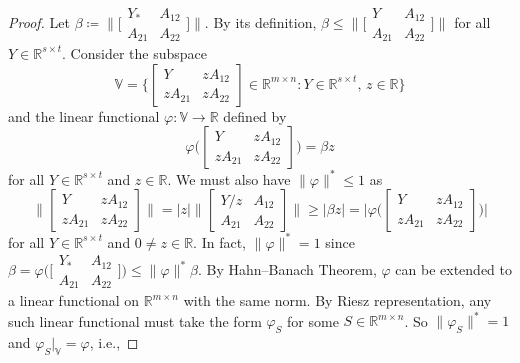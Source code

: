 \documentclass[10pt,a4paper]{amsart}
\newcommand{\R}{\mathbb{R}}
\begin{document}
\begin{proof}
Let $\beta \coloneqq \bigl \lVert \bigl[\begin{smallmatrix}
    Y_* & A_{12} \\
A_{21} & A_{22}
\end{smallmatrix}\bigr]  \bigr\rVert$. By its definition, $\beta \le \bigl \lVert \bigl[\begin{smallmatrix}
    Y & A_{12} \\
A_{21} & A_{22}
\end{smallmatrix}\bigr]  \bigr\rVert$ for all $Y \in \R^{s \times t}$. Consider the subspace
\[
\mathbb{V} = \biggl\{ \begin{bmatrix}
    Y &zA_{12}\\
    zA_{21} &zA_{22}
\end{bmatrix} \in \R^{m \times n} : Y \in \R^{s\times t},\, z \in \R  \biggr\}
\]
and the linear functional $\varphi : \mathbb{V} \to \mathbb{R}$ defined by
\[
\varphi\biggl(\begin{bmatrix} 
    Y &zA_{12}\\
    zA_{21} &zA_{22}
\end{bmatrix}\biggr) = \beta z
\]
for all $Y \in \R^{s\times t}$ and $z \in \R$. 
We must also have $\lVert \varphi\rVert^* \le 1$ as
\[
\biggl\lVert \begin{bmatrix}
    Y &zA_{12}\\
    zA_{21} &zA_{22}
\end{bmatrix} \biggr\rVert = \lvert z \rvert \biggl\lVert \begin{bmatrix}
    Y/z &A_{12}\\
    A_{21} & A_{22}
\end{bmatrix} \biggr\rVert \ge \lvert  \beta z\rvert =  \biggl\lvert \varphi \biggl( \begin{bmatrix} 
    Y &zA_{12}\\
    zA_{21} &zA_{22}
\end{bmatrix} \biggr) \biggr\rvert
\]
for all $Y\in \R^{s \times t}$  and $0 \ne z \in \R$.
In fact, $\lVert  \varphi\rVert^* = 1$ since $\beta =  \varphi\bigl(  \bigl[\begin{smallmatrix}
    Y_* & A_{12} \\
A_{21} & A_{22}
\end{smallmatrix}\bigr] \bigr) \le \lVert \varphi \rVert^* \beta$. By Hahn--Banach Theorem, $\varphi$ can be extended to a linear functional on $\R^{m\times n}$ with the same norm. By Riesz representation, any such linear functional must take the form $\varphi_S$ for some $S  \in \R^{m\times n}$.  So  $\lVert \varphi_S\rVert^* = 1$ and $\varphi_S \bigr\rvert_{\mathbb{V}} =\varphi$, i.e.,

\end{proof}
\end{document}
